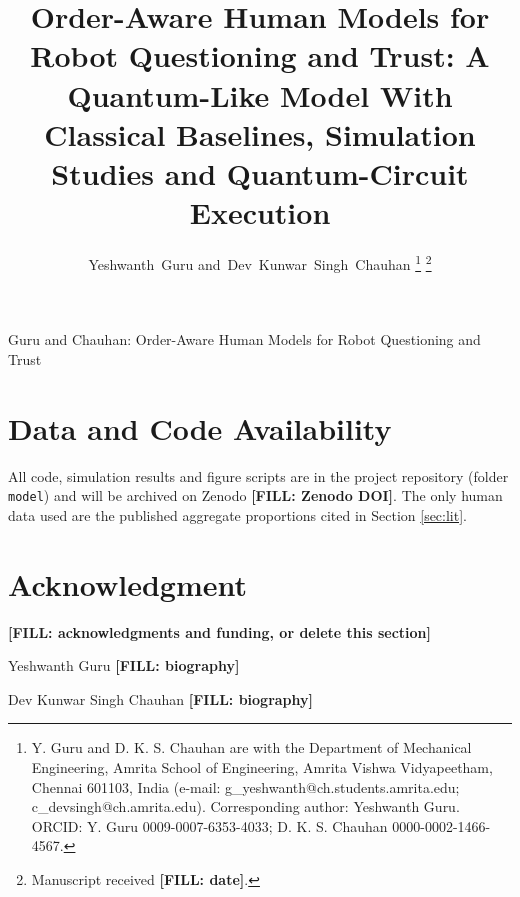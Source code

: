 \documentclass[journal]{IEEEtran}
\newcommand{\fillin}[1]{{\color{red}\bfseries [FILL: #1]}}
\begin{document}
\title{Order-Aware Human Models for Robot Questioning and Trust: A Quantum-Like Model With Classical Baselines, Simulation Studies and Quantum-Circuit Execution}

\author{Yeshwanth~Guru and~Dev~Kunwar~Singh~Chauhan%
\thanks{Y. Guru and D. K. S. Chauhan are with the Department of Mechanical Engineering, Amrita School of Engineering, Amrita Vishwa Vidyapeetham, Chennai 601103, India (e-mail: g\_yeshwanth@ch.students.amrita.edu; c\_devsingh@ch.amrita.edu). Corresponding author: Yeshwanth Guru. ORCID: Y. Guru 0009-0007-6353-4033; D. K. S. Chauhan 0000-0002-1466-4567.}%
\thanks{Manuscript received \fillin{date}.}}

%
{Guru and Chauhan: Order-Aware Human Models for Robot Questioning and Trust}

\maketitle







\section*{Data and Code Availability}
All code, simulation results and figure scripts are in the project repository (folder \texttt{model}) and will be archived on Zenodo \fillin{Zenodo DOI}. The only human data used are the published aggregate proportions cited in Section \ref{sec:lit}.

\section*{Acknowledgment}
\fillin{acknowledgments and funding, or delete this section}




\begin{IEEEbiographynophoto}{Yeshwanth Guru}
\fillin{biography}
\end{IEEEbiographynophoto}

\begin{IEEEbiographynophoto}{Dev Kunwar Singh Chauhan}
\fillin{biography}
\end{IEEEbiographynophoto}
\end{document}
